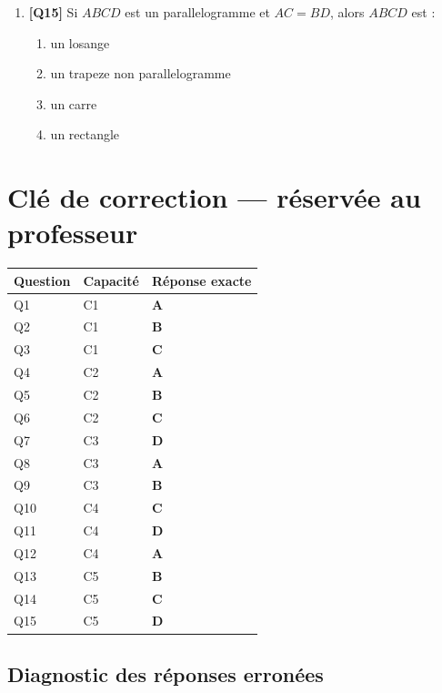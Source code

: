 \begin{enumerate}
\item \textbf{[Q15]} Si $ABCD$ est un parallelogramme et $AC = BD$, alors $ABCD$ est :
  \begin{enumerate}[label=\Alph*.]
    \item un losange
    \item un trapeze non parallelogramme
    \item un carre
    \item un rectangle
  \end{enumerate}

\end{enumerate}

\ifnxVersionProfesseur
\clearpage
\section*{Clé de correction — réservée au professeur}

\begin{center}
\begin{tabular}{lll}
\hline
Question & Capacité & Réponse exacte \\
\hline
Q1 & C1 & \textbf{A} \\
Q2 & C1 & \textbf{B} \\
Q3 & C1 & \textbf{C} \\
Q4 & C2 & \textbf{A} \\
Q5 & C2 & \textbf{B} \\
Q6 & C2 & \textbf{C} \\
Q7 & C3 & \textbf{D} \\
Q8 & C3 & \textbf{A} \\
Q9 & C3 & \textbf{B} \\
Q10 & C4 & \textbf{C} \\
Q11 & C4 & \textbf{D} \\
Q12 & C4 & \textbf{A} \\
Q13 & C5 & \textbf{B} \\
Q14 & C5 & \textbf{C} \\
Q15 & C5 & \textbf{D} \\
\hline
\end{tabular}
\end{center}

\subsection*{Diagnostic des réponses erronées}

